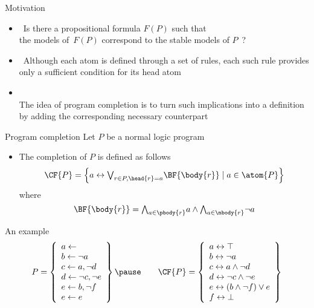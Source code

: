 \begin{frame}{Motivation}
  \bigskip
  \begin{itemize}
  \item<1->  \
    Is there a propositional formula $F(P)$ such that
    \\
    the models of~$F(P)$ correspond to the stable models of $P$~?
    \bigskip
  \item<2->  \
    Although each atom is defined through a set of rules,
    each such rule provides only a \alert{sufficient} condition for its head atom
    \bigskip
  \item<3-> \structure{Clark's Idea} \\
    \smallskip
    The idea of program completion is to turn such implications into a definition
    by adding the corresponding \alert{necessary} counterpart
  \end{itemize}
\end{frame}
\begin{frame}{Program completion}
  \bigskip
  Let $P$ be a normal logic program
  \bigskip
  \begin{itemize}
  \item
    The \alert{completion}  of $P$ is defined as follows
    \[
    \CF{P}
    =
    \left\{a \leftrightarrow \textstyle{\bigvee_{r\in P, \head{r} = a}} \BF{\body{r}} \mid a\in\atom{P}\right\}
    \]
    where
    \[
    \BF{\body{r}}
    =
    \textstyle{\bigwedge_{a\in\pbody{r}}}      a
    \wedge
    \textstyle{\bigwedge_{a\in\nbody{r}}} \neg a
    \]
  \end{itemize}
\end{frame}
\begin{frame}{An example}
\[
P
=
\left\{
  \begin{array}{l}
    a \leftarrow                \\
    b \leftarrow \neg a         \\
    c \leftarrow a, \neg d      \\
    d \leftarrow \neg c, \neg e \\
    e \leftarrow b, \neg f      \\
    e \leftarrow e
  \end{array}
\right\}
\pause\qquad
\CF{P}
=
\left\{
  \begin{array}{l}
    a \leftrightarrow \top                    \\
    b \leftrightarrow \neg{a}                 \\
    c \leftrightarrow a\wedge \neg{d}         \\
    d \leftrightarrow \neg{c}\wedge \neg{e}   \\
    e \leftrightarrow (b\wedge \neg{f}) \vee e\\
    f \leftrightarrow \bot
  \end{array}
\right\}
\]
\end{frame}
